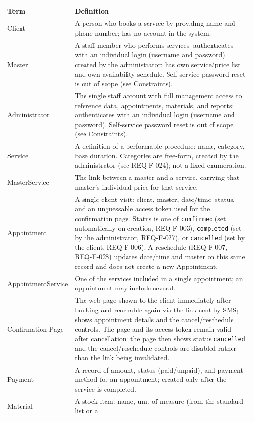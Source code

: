 \documentclass[11pt,a4paper]{article}
\begin{document}
\begin{longtable}{L{3.4cm}L{10.6cm}}
\toprule
Term & Definition \\
\midrule
\endhead
Client & A person who books a service by providing name and phone number;
  has no account in the system. \\
Master & A staff member who performs services; authenticates with an
  individual login (username and password) created by the administrator;
  has own service/price list and own availability schedule. Self-service
  password reset is out of scope (see Constraints). \\
Administrator & The single staff account with full management access to
  reference data, appointments, materials, and reports; authenticates with
  an individual login (username and password). Self-service password reset
  is out of scope (see Constraints). \\
Service & A definition of a performable procedure: name, category, base
  duration. Categories are free-form, created by the administrator (see
  REQ-F-024); not a fixed enumeration. \\
MasterService & The link between a master and a service, carrying that
  master's individual price for that service. \\
Appointment & A single client visit: client, master, date/time, status,
  and an unguessable access token used for the confirmation page. Status is
  one of \texttt{confirmed} (set automatically on creation, REQ-F-003),
  \texttt{completed} (set by the administrator, REQ-F-027), or
  \texttt{cancelled} (set by the client, REQ-F-006). A reschedule
  (REQ-F-007, REQ-F-028) updates date/time and master on this same record
  and does not create a new Appointment. \\
AppointmentService & One of the services included in a single appointment;
  an appointment may include several. \\
Confirmation Page & The web page shown to the client immediately after
  booking and reachable again via the link sent by SMS; shows appointment
  details and the cancel/reschedule controls. The page and its access token
  remain valid after cancellation: the page then shows status
  \texttt{cancelled} and the cancel/reschedule controls are disabled
  rather than the link being invalidated. \\
Payment & A record of amount, status (paid/unpaid), and payment method for
  an appointment; created only after the service is completed. \\
Material & A stock item: name, unit of measure (from the standard list or a

\end{longtable}
\end{document}
